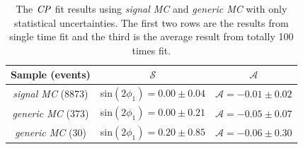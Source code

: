 \begin{table}
	\centering
	\caption{The $\it{CP}$ fit results using \textit{signal MC} and \textit{generic MC} with only statistical uncertainties. The first two rows are the results from single time fit and the third is the average result from totally 100 times fit.}
	\label{tab:cpfit_result_mc}
\begin{tabular}{|c|c|c|}
	\hline
	Sample (events)& $\mathcal{S}$ &  $\mathcal{A}$\\
	\hline
	\textit{signal MC} (8873) & sin$(2\phi_1) = 0.00 \pm 0.04 $ &  $\mathcal{A} = -0.01 \pm 0.02$\\
	\hline
	\textit{generic MC} (373) &  sin$(2\phi_1)  = 0.00 \pm 0.21$ & $\mathcal{A}  = -0.05 \pm 0.07$ \\
	\hline
	\textit{generic MC} (30) & sin$(2\phi_1) = 0.20 \pm 0.85 $& $\mathcal{A} = -0.06 \pm 0.30$ \\
	\hline
\end{tabular}
\end{table}

